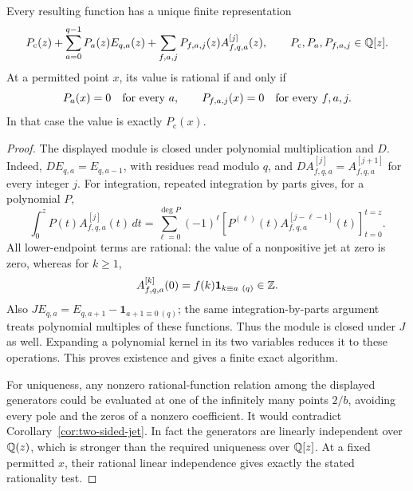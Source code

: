 \begin{theorem}
\label{thm:operator-normal-form}
Every resulting function has a unique finite representation
\begin{equation}\label{eq:operator-normal-form}
 P_{\mathrm c}(z)+\sum_{a=0}^{q-1}P_a(z)E_{q,a}(z)
   +\sum_{f,a,j}P_{f,a,j}(z)A_{f,q,a}^{[j]}(z),
 \qquad P_{\mathrm c},P_a,P_{f,a,j}\in\mathbb Q[z].
\end{equation}
At a permitted point $x$, its value is rational if and only if
\[
 P_a(x)=0\quad\hbox{for every }a,
 \qquad P_{f,a,j}(x)=0\quad\hbox{for every }f,a,j.
\]
In that case the value is exactly $P_{\mathrm c}(x)$.
\end{theorem}
\begin{proof}
The displayed module is closed under polynomial multiplication and $D$.
Indeed, $DE_{q,a}=E_{q,a-1}$, with residues read modulo $q$, and
$DA_{f,q,a}^{[j]}=A_{f,q,a}^{[j+1]}$ for every integer $j$.
For integration, repeated integration by parts gives, for a polynomial $P$,
\begin{equation}\label{eq:polynomial-ibp}
 \int_0^z P(t)A_{f,q,a}^{[j]}(t)\,dt
 =\sum_{\ell=0}^{\deg P}(-1)^\ell
 \left[P^{(\ell)}(t)A_{f,q,a}^{[j-\ell-1]}(t)\right]_{t=0}^{t=z}.
\end{equation}
All lower-endpoint terms are rational: the value of a nonpositive jet
at zero is zero, whereas for $k\geq1$,
\[
 A_{f,q,a}^{[k]}(0)=f(k)\mathbf1_{k\equiv a\ (q)}\in\Z.
\]
Also $JE_{q,a}=E_{q,a+1}-\mathbf1_{a+1\equiv0\ (q)}$;
the same integration-by-parts argument treats polynomial multiples of
these functions.  Thus the module is closed under $J$ as well.
Expanding a polynomial kernel in its two variables reduces it to these
operations.  This proves existence and gives a finite exact algorithm.

For uniqueness, any nonzero rational-function relation among the displayed
generators could be evaluated at one of the infinitely many points $2/b$,
avoiding every pole and the zeros of a nonzero coefficient.  It would
contradict Corollary~\ref{cor:two-sided-jet}.  In fact the generators are
linearly independent over $\mathbb Q(z)$, which is stronger than the required
uniqueness over $\mathbb Q[z]$.  At a fixed permitted $x$, their rational linear
independence gives exactly the stated rationality test.
\end{proof}


